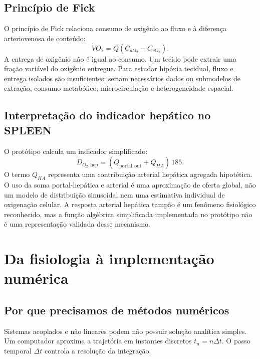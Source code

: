 \documentclass[11pt,a4paper,oneside]{book}
\newcommand{\Qportout}{Q_{\mathrm{portal,out}}}
\begin{document}
\section{Princípio de Fick}
O princípio de Fick relaciona consumo de oxigênio ao fluxo e à diferença arteriovenosa de conteúdo:
\begin{equation}
  \dot V O_2=Q(C_{aO_2}-C_{vO_2}).
\end{equation}
A entrega de oxigênio não é igual ao consumo. Um tecido pode extrair uma fração variável do oxigênio entregue. Para estudar hipóxia tecidual, fluxo e entrega isolados são insuficientes: seriam necessários dados ou submodelos de extração, consumo metabólico, microcirculação e heterogeneidade espacial.

\section{Interpretação do indicador hepático no SPLEEN}
O protótipo calcula um indicador simplificado:
\begin{equation}
  D_{O_2,\mathrm{hep}}=
  (\Qportout+Q_{HA})\,185.
\end{equation}
O termo $Q_{HA}$ representa uma contribuição arterial hepática agregada hipotética. O uso da soma portal-hepática e arterial é uma aproximação de oferta global, não um modelo de distribuição sinusoidal nem uma estimativa individual de oxigenação celular. A resposta arterial hepática tampão é um fenômeno fisiológico reconhecido, mas a função algébrica simplificada implementada no protótipo não é uma representação validada desse mecanismo.

\chapter{Da fisiologia à implementação numérica}

\section{Por que precisamos de métodos numéricos}
Sistemas acoplados e não lineares podem não possuir solução analítica simples. Um computador aproxima a trajetória em instantes discretos $t_n=n\Delta t$. O passo temporal $\Delta t$ controla a resolução da integração.
\end{document}
